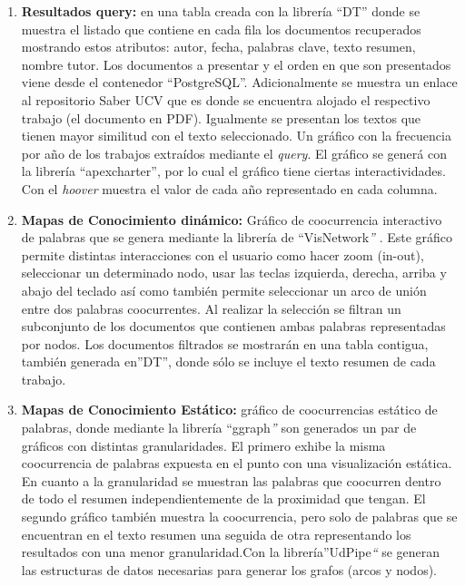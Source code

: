 \documentclass[
  12pt,
  openany]{book}
\begin{document}
\begin{enumerate}
\begin{enumerate}
    \begin{enumerate}
    \def\labelenumiii{\arabic{enumiii}.}
    \item
      \textbf{Resultados query:} en una tabla creada con la librería ``DT'' donde se muestra el listado que contiene en cada fila los documentos recuperados mostrando estos atributos: autor, fecha, palabras clave, texto resumen, nombre tutor. Los documentos a presentar y el orden en que son presentados viene desde el contenedor ``PostgreSQL''. Adicionalmente se muestra un enlace al repositorio Saber UCV que es donde se encuentra alojado el respectivo trabajo (el documento en PDF). Igualmente se presentan los textos que tienen mayor similitud con el texto seleccionado. Un gráfico con la frecuencia por año de los trabajos extraídos mediante el \emph{query}. El gráfico se generá con la librería ``apexcharter'', por lo cual el gráfico tiene ciertas interactividades. Con el \emph{hoover} muestra el valor de cada año representado en cada columna.
    \item
      \textbf{Mapas de Conocimiento dinámico:} Gráfico de coocurrencia interactivo de palabras que se genera mediante la librería de ``VisNetwork\emph{''} . Este gráfico permite distintas interacciones con el usuario como hacer zoom (in-out), seleccionar un determinado nodo, usar las teclas izquierda, derecha, arriba y abajo del teclado así como también permite seleccionar un arco de unión entre dos palabras coocurrentes. Al realizar la selección se filtran un subconjunto de los documentos que contienen ambas palabras representadas por nodos. Los documentos filtrados se mostrarán en una tabla contigua, también generada en''DT'', donde sólo se incluye el texto resumen de cada trabajo.
    \item
      \textbf{Mapas de Conocimiento Estático:} gráfico de coocurrencias estático de palabras, donde mediante la librería ``ggraph\emph{''} son generados un par de gráficos con distintas granularidades. El primero exhibe la misma coocurrencia de palabras expuesta en el punto con una visualización estática. En cuanto a la granularidad se muestran las palabras que coocurren dentro de todo el resumen independientemente de la proximidad que tengan. El segundo gráfico también muestra la coocurrencia, pero solo de palabras que se encuentran en el texto resumen una seguida de otra representando los resultados con una menor granularidad.Con la librería''UdPipe\emph{``} se generan las estructuras de datos necesarias para generar los grafos (arcos y nodos).
    \end{enumerate}


\end{enumerate}
\end{enumerate}
\end{document}
